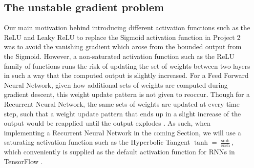 \documentclass
[twocolumn,
secnumarabic,
nobibnotes,
aps,
prl,
reprint,
groupedaddress,
amsmath,
amssymb,
]{revtex4-2}
\begin{document}
\subsection{The unstable gradient problem}
Our main motivation behind introducing different activation functions such as the ReLU and Leaky ReLU to replace the Sigmoid activation function in Project 2 was to avoid the vanishing gradient which arose from the bounded output from the Sigmoid. However, a non-saturated activation function such as the ReLU family of functions runs the risk of updating the set of weights between two layers in such a way that the computed output is slightly increased. For a Feed Forward Neural Network, given how additional sets of weights are computed during gradient descent, this weight update pattern is not given to reoccur. Though for a Recurrent Neural Network, the same sets of weights are updated at every time step, such that a weight update pattern that ends up in a slight increase of the output would be reapplied until the output explodes \cite{Geron2019}. As such, when implementing a Recurrent Neural Network in the coming Section, we will use a saturating activation function such as the Hyperbolic Tangent $\tanh = \frac{\sinh}{\cosh}$, which conveniently is supplied as the default activation function for RNNs in TensorFlow \cite{tensorflow2015-whitepaper}.
\end{document}
